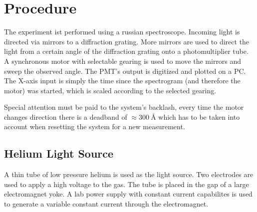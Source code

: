 \chapter{Procedure}

The experiment ist performed using a russian spectroscope.
Incoming light is directed via mirrors to a diffraction grating.
More mirrors are used to direct the light from a certain angle of the diffraction grating onto a photomultiplier tube.
A synchronous motor with selectable gearing is used to move the mirrors and sweep the observed angle.
The PMT's output is digitized and plotted on a PC.
The X-axis input is simply the time since the spectrogram (and therefore the motor) was started, which is scaled according to the selected gearing.

Special attention must be paid to the system's backlash, every time the motor changes direction there is a deadband of $\approx\SI{300}{\angstrom}$ which has to be taken into account when resetting the system for a new measurement.

\section{Helium Light Source}
A thin tube of low pressure helium is used as the light source.
Two electrodes are used to apply a high voltage to the gas.
The tube is placed in the gap of a large electromagnet yoke.
A lab power supply with constant current capabilites is used to generate a variable constant current through the electromagnet.
